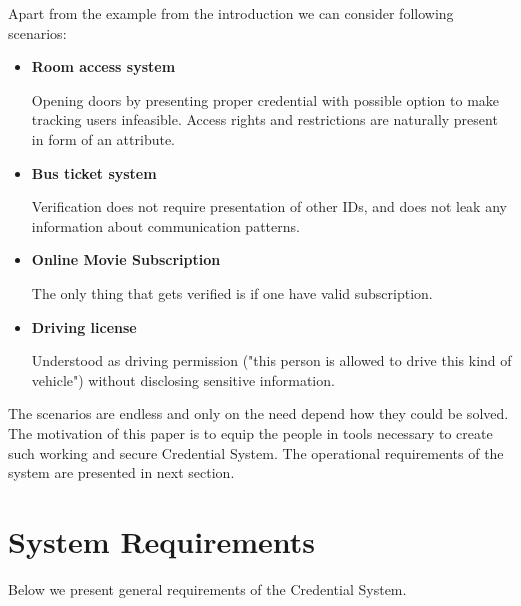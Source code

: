 Apart from the example from the introduction we can consider following scenarios:
\begin{itemize}
    \item \textbf{Room access system}
    
    Opening doors by presenting proper credential with possible option to make tracking users infeasible. Access rights and restrictions are naturally present in form of an attribute.
    \item \textbf{Bus ticket system}
    
    Verification does not require presentation of other IDs, and does not leak any information about communication patterns.
    \item \textbf{Online Movie Subscription}
    
    The only thing that gets verified is if one have valid subscription.
    \item \textbf{Driving license}
    
    Understood as driving permission ("this person is allowed to drive this kind of vehicle") without disclosing sensitive information.
\end{itemize}

The scenarios are endless and only on the need depend how they could be solved. The motivation of this paper is to equip the people in tools necessary to create such working and secure Credential System. The operational requirements of the system are presented in next section.


\section{System Requirements}
Below we present general requirements of the Credential System.

